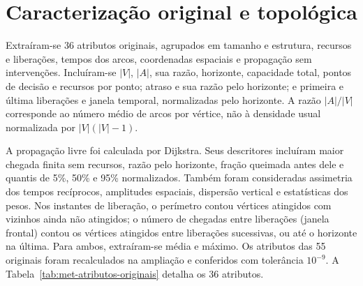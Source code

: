 \section{Caracterização original e topológica}\label{sec:met-topologia}

Extraíram-se 36 atributos originais, agrupados em tamanho e estrutura,
recursos e liberações, tempos dos arcos, coordenadas espaciais e propagação
sem intervenções. Incluíram-se $|V|$, $|A|$, sua razão, horizonte,
capacidade total, pontos de decisão e recursos por ponto; atraso e sua
razão pelo horizonte; e primeira e última liberações e janela temporal,
normalizadas pelo horizonte. A razão $|A|/|V|$ corresponde ao número médio
de arcos por vértice, não à densidade usual normalizada por $|V|(|V|-1)$.

A propagação livre foi calculada por Dijkstra. Seus descritores incluíram
maior chegada finita sem recursos, razão pelo horizonte, fração queimada antes dele e
quantis de 5\%, 50\% e 95\% normalizados. Também foram consideradas
assimetria dos tempos recíprocos, amplitudes espaciais, dispersão vertical
e estatísticas dos pesos. Nos instantes de liberação, o perímetro contou
vértices atingidos com vizinhos ainda não atingidos; o número de chegadas
entre liberações (janela frontal) contou os vértices atingidos entre
liberações sucessivas, ou até o horizonte na última.
Para ambos, extraíram-se média e máximo. Os atributos das 55 originais
foram recalculados na ampliação e conferidos com tolerância $10^{-9}$.
A Tabela~\ref{tab:met-atributos-originais} detalha os 36 atributos.

